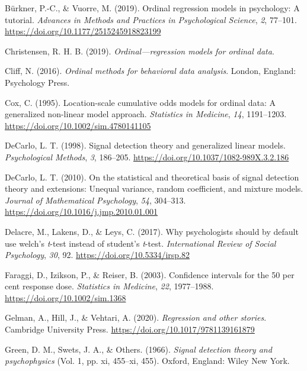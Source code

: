 \documentclass[
  man,floatsintext]{apa6}
\newlength{\cslhangindent}
\newenvironment{CSLReferences}[2] %
 {\begin{list}{}{%
  \setlength{\itemindent}{0pt}
  \setlength{\leftmargin}{0pt}
  \setlength{\parsep}{0pt}
  \ifodd #1
   \setlength{\leftmargin}{\cslhangindent}
   \setlength{\itemindent}{-1\cslhangindent}
  \fi
  \setlength{\itemsep}{#2\baselineskip}}}
 {\end{list}}
\begin{document}
\label{refs}
\begin{CSLReferences}{1}{0}
Bürkner, P.-C., \& Vuorre, M. (2019). Ordinal regression models in psychology: A tutorial. \emph{Advances in Methods and Practices in Psychological Science}, \emph{2}, 77--101. \url{https://doi.org/10.1177/2515245918823199}

Christensen, R. H. B. (2019). \emph{Ordinal---regression models for ordinal data}.

Cliff, N. (2016). \emph{Ordinal methods for behavioral data analysis}. London, England: Psychology Press.

Cox, C. (1995). Location-scale cumulative odds models for ordinal data: A generalized non-linear model approach. \emph{Statistics in Medicine}, \emph{14}, 1191--1203. \url{https://doi.org/10.1002/sim.4780141105}

DeCarlo, L. T. (1998). Signal detection theory and generalized linear models. \emph{Psychological Methods}, \emph{3}, 186--205. \url{https://doi.org/10.1037/1082-989X.3.2.186}

DeCarlo, L. T. (2010). On the statistical and theoretical basis of signal detection theory and extensions: Unequal variance, random coefficient, and mixture models. \emph{Journal of Mathematical Psychology}, \emph{54}, 304--313. \url{https://doi.org/10.1016/j.jmp.2010.01.001}

Delacre, M., Lakens, D., \& Leys, C. (2017). Why psychologists should by default use welch's \emph{t}-test instead of student's \emph{t}-test. \emph{International Review of Social Psychology}, \emph{30}, 92. \url{https://doi.org/10.5334/irsp.82}

Faraggi, D., Izikson, P., \& Reiser, B. (2003). Confidence intervals for the 50 per cent response dose. \emph{Statistics in Medicine}, \emph{22}, 1977--1988. \url{https://doi.org/10.1002/sim.1368}

Gelman, A., Hill, J., \& Vehtari, A. (2020). \emph{Regression and other stories}. Cambridge University Press. \url{https://doi.org/10.1017/9781139161879}

Green, D. M., Swets, J. A., \& Others. (1966). \emph{Signal detection theory and psychophysics} (Vol. 1, pp. xi, 455--xi, 455). Oxford, England: Wiley New York.


\end{CSLReferences}
\end{document}
